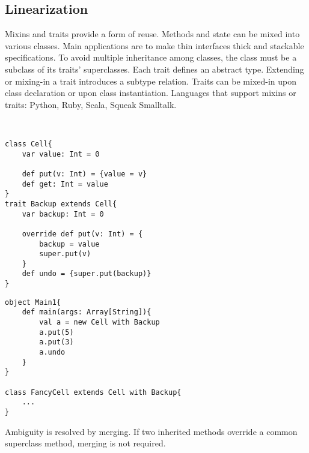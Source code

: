 \subsection{Linearization}
\begin{mytitle} Mixins and traits provide a form of reuse. Methods and state can be mixed into various classes. Main applications are to make thin interfaces thick and stackable specifications. To avoid multiple inheritance among classes, the class must be a subclass of its traits' superclasses. Each trait defines an abstract type. Extending or mixing-in a trait introduces a subtype relation. Traits can be mixed-in upon class declaration or upon class instantiation. Languages that support mixins or traits: Python, Ruby, Scala, Squeak Smalltalk.
\end{mytitle}
\begin{mytitle}\hfill\\
\lstset{language=Scala}
\begin{minipage}[t]{0.55\textwidth}
\begin{lstlisting}
class Cell{
    var value: Int = 0
    
    def put(v: Int) = {value = v}
    def get: Int = value
}
trait Backup extends Cell{
    var backup: Int = 0
    
    override def put(v: Int) = {
        backup = value
        super.put(v)
    }
    def undo = {super.put(backup)}
}
\end{lstlisting}
\end{minipage}
\begin{minipage}[t]{0.5\textwidth}
\begin{lstlisting}
object Main1{
    def main(args: Array[String]){
        val a = new Cell with Backup
        a.put(5)
        a.put(3)
        a.undo
    }
}

class FancyCell extends Cell with Backup{
    ...
}
\end{lstlisting}
\end{minipage}
\end{mytitle}
\begin{mytitle} Ambiguity is resolved by merging. If two inherited methods override a common superclass method, merging is not required. 
\end{mytitle}
